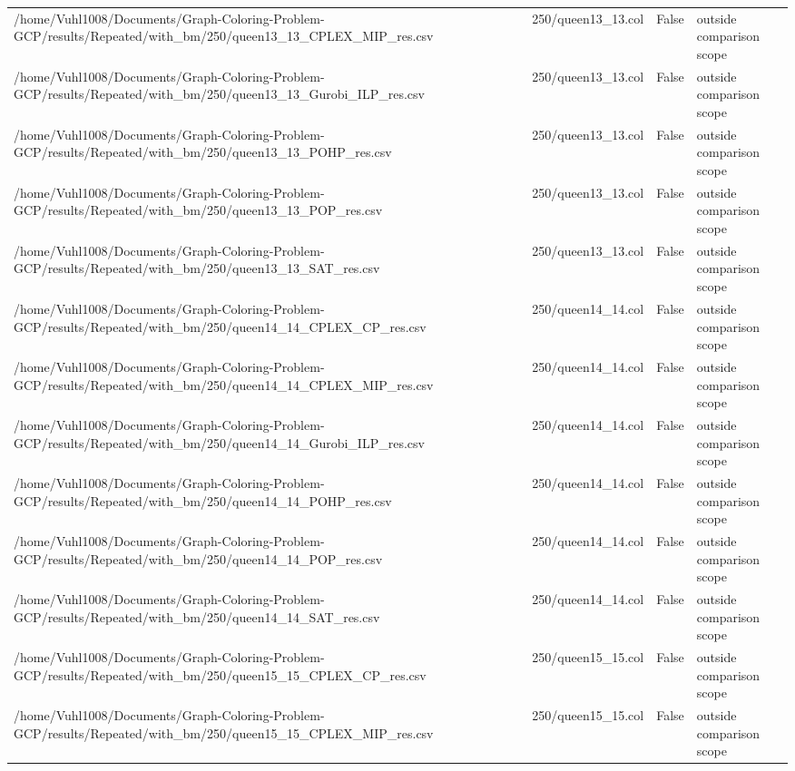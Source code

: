 \begin{table}[htbp]
\begin{tabular}{llll}
/home/Vuhl1008/Documents/Graph-Coloring-Problem-GCP/results/Repeated/with\_bm/250/queen13\_13\_CPLEX\_MIP\_res.csv & 250/queen13\_13.col & False & outside comparison scope \\
/home/Vuhl1008/Documents/Graph-Coloring-Problem-GCP/results/Repeated/with\_bm/250/queen13\_13\_Gurobi\_ILP\_res.csv & 250/queen13\_13.col & False & outside comparison scope \\
/home/Vuhl1008/Documents/Graph-Coloring-Problem-GCP/results/Repeated/with\_bm/250/queen13\_13\_POHP\_res.csv & 250/queen13\_13.col & False & outside comparison scope \\
/home/Vuhl1008/Documents/Graph-Coloring-Problem-GCP/results/Repeated/with\_bm/250/queen13\_13\_POP\_res.csv & 250/queen13\_13.col & False & outside comparison scope \\
/home/Vuhl1008/Documents/Graph-Coloring-Problem-GCP/results/Repeated/with\_bm/250/queen13\_13\_SAT\_res.csv & 250/queen13\_13.col & False & outside comparison scope \\
/home/Vuhl1008/Documents/Graph-Coloring-Problem-GCP/results/Repeated/with\_bm/250/queen14\_14\_CPLEX\_CP\_res.csv & 250/queen14\_14.col & False & outside comparison scope \\
/home/Vuhl1008/Documents/Graph-Coloring-Problem-GCP/results/Repeated/with\_bm/250/queen14\_14\_CPLEX\_MIP\_res.csv & 250/queen14\_14.col & False & outside comparison scope \\
/home/Vuhl1008/Documents/Graph-Coloring-Problem-GCP/results/Repeated/with\_bm/250/queen14\_14\_Gurobi\_ILP\_res.csv & 250/queen14\_14.col & False & outside comparison scope \\
/home/Vuhl1008/Documents/Graph-Coloring-Problem-GCP/results/Repeated/with\_bm/250/queen14\_14\_POHP\_res.csv & 250/queen14\_14.col & False & outside comparison scope \\
/home/Vuhl1008/Documents/Graph-Coloring-Problem-GCP/results/Repeated/with\_bm/250/queen14\_14\_POP\_res.csv & 250/queen14\_14.col & False & outside comparison scope \\
/home/Vuhl1008/Documents/Graph-Coloring-Problem-GCP/results/Repeated/with\_bm/250/queen14\_14\_SAT\_res.csv & 250/queen14\_14.col & False & outside comparison scope \\
/home/Vuhl1008/Documents/Graph-Coloring-Problem-GCP/results/Repeated/with\_bm/250/queen15\_15\_CPLEX\_CP\_res.csv & 250/queen15\_15.col & False & outside comparison scope \\
/home/Vuhl1008/Documents/Graph-Coloring-Problem-GCP/results/Repeated/with\_bm/250/queen15\_15\_CPLEX\_MIP\_res.csv & 250/queen15\_15.col & False & outside comparison scope \\

\end{tabular}
\end{table}
